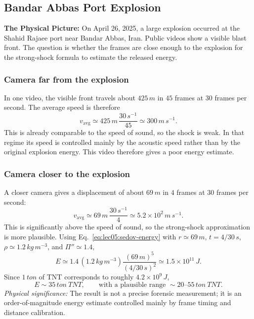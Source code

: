 \subsection{Bandar Abbas Port Explosion}
\label{sec:lec05:bandar-abbas}

\textbf{The Physical Picture:}
On April 26, 2025, a large explosion occurred at the Shahid Rajaee port near
Bandar Abbas, Iran. Public videos show a visible blast front. The question is
whether the frames are close enough to the explosion for the strong-shock
formula to estimate the released energy.

\subsubsection*{Camera far from the explosion}
In one video, the visible front travels about $425\,\si{m}$ in $45$ frames at
$30$ frames per second. The average speed is therefore
\begin{equation}
    v_{\mathrm{avg}}
    \simeq
    425\,\si{m}\,
    \frac{30\,\si{s^{-1}}}{45}
    \simeq 300\,\si{m\,s^{-1}} .
    \label{eq:lec05:camera-one-speed}
\end{equation}
This is already comparable to the speed of sound, so the shock is weak. In
that regime its speed is controlled mainly by the acoustic speed rather than
by the original explosion energy. This video therefore gives a poor energy
estimate.

\subsubsection*{Camera closer to the explosion}
A closer camera gives a displacement of about $69\,\si{m}$ in $4$ frames at
$30$ frames per second:
\begin{equation}
    v_{\mathrm{avg}}
    \simeq
    69\,\si{m}\,
    \frac{30\,\si{s^{-1}}}{4}
    \simeq 5.2\times10^2\,\si{m\,s^{-1}} .
    \label{eq:lec05:camera-two-speed}
\end{equation}
This is significantly above the speed of sound, so the strong-shock
approximation is more plausible. Using Eq.~\eqref{eq:lec05:sedov-energy} with
$r\simeq69\,\si{m}$, $t=4/30\,\si{s}$, $\rho\simeq1.2\,\si{kg\,m^{-3}}$, and
$\Pi''\simeq1.4$,
\begin{equation}
    E
    \simeq
    1.4\,(1.2\,\si{kg\,m^{-3}})
    \frac{(69\,\si{m})^5}{(4/30\,\si{s})^2}
    \simeq
    1.5\times10^{11}\,\si{J}.
    \label{eq:lec05:bandar-energy-joule}
\end{equation}
Since $1\,\si{ton}$ of TNT corresponds to roughly $4.2\times10^9\,\si{J}$,
\begin{equation}
    \boxed{
    E \sim 35\,\si{ton\ TNT},
    \qquad
    \text{with a plausible range } \sim 20\text{--}55\,\si{ton\ TNT}.
    }
    \label{eq:lec05:bandar-energy-tnt}
\end{equation}
\textit{Physical significance:} The result is not a precise forensic
measurement; it is an order-of-magnitude energy estimate controlled mainly by
frame timing and distance calibration.

